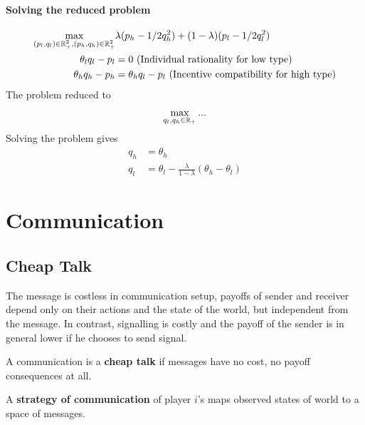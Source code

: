 \documentclass{article}
\begin{document}
   	\paragraph{Solving the reduced problem}
   	\begin{align}
   		\max_{(p_l, q_l) \in \mathbb{R}^2_+, (p_h, q_h) \in \mathbb{R}^2_+} &\lambda (p_h - 1/2 q_h^2) + (1 - \lambda) (p_l - 1/2 q_l^2) \\
   		\theta_l q_l - p_l &= 0 \text{{ (Individual rationality for low type)}} \\
   		\theta_h q_h - p_h &= \theta_h q_l - p_l \text{{ (Incentive compatibility for high type)}}
   	\end{align}
   	The problem reduced to
   	\begin{align}
   		\max_{q_l, q_h \in \mathbb{R}_+} ...
   	\end{align}
   	Solving the problem gives
   	\begin{align}
   		q_h &= \theta_h \\
   		q_l &= \theta_l - \frac{\lambda}{1 - \lambda}(\theta_h - \theta_l)
   	\end{align}
   	
   	\section{Communication}
   	\subsection{Cheap Talk}
   	\begin{remark}
   		The message is costless in communication setup, payoffs of sender and receiver depend only on their actions and the state of the world, but independent from the message. In contrast, signalling is costly and the payoff of the sender is in general lower if he chooses to send signal.
   	\end{remark}
   	
   	\begin{definition}
   		A communication is a \textbf{cheap talk} if messages have no cost, no payoff consequences at all.
   	\end{definition}
   	
   	\begin{definition}
   		A \textbf{strategy of communication} of player $i$'s maps observed states of world to a space of messages.
   	\end{definition}
   	
\end{document}
